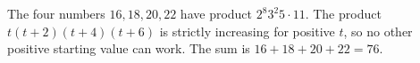 The four numbers $16,18,20,22$ have product $2^8 3^2 5\cdot11$. The product $t(t+2)(t+4)(t+6)$ is strictly increasing for positive $t$, so no other positive starting value can work. The sum is $16+18+20+22=\boxed{76}$.
